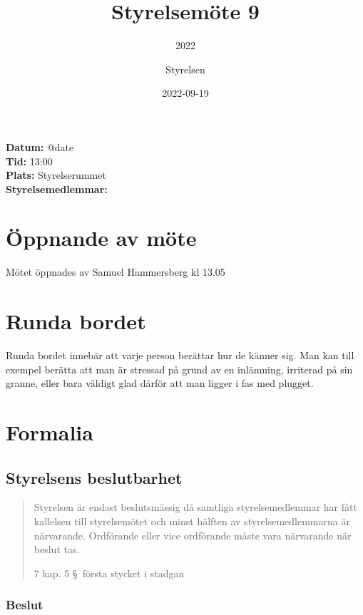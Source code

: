 \documentclass[protokoll]{dvd}
\begin{document}
\title{Styrelsemöte 9}
\subtitle{2022}
\author{Styrelsen}
\date{2022-09-19}

\textbf{Datum:} \csname @date\endcsname\\
\textbf{Tid:} 13:00\\
\textbf{Plats:} Styrelserummet\\
\textbf{Styrelsemedlemmar:}
\begin{närvarande_förtroendevalda}
\end{närvarande_förtroendevalda}

\section{Öppnande av möte}

Mötet öppnades av Samuel Hammersberg kl 13.05

\section{Runda bordet}

Runda bordet innebär att varje person berättar hur de känner sig.
Man kan till exempel berätta att man är stressad på grund av en inlämning,
irriterad på sin granne, eller bara väldigt glad därför att man ligger i fas med plugget.

\section{Formalia}

\subsection{Styrelsens beslutbarhet}

\blockquote[7 kap. 5 \S~första stycket i stadgan][]{%
    Styrelsen är endast beslutsmässig då samtliga styrelsemedlemmar har
    fått kallelsen till styrelsemötet och minst hälften av styrelsemedlemmarna är närvarande.
    Ordförande eller vice ordförande måste vara närvarande när beslut tas.
}

\subsubsection*{Beslut}
\end{document}
